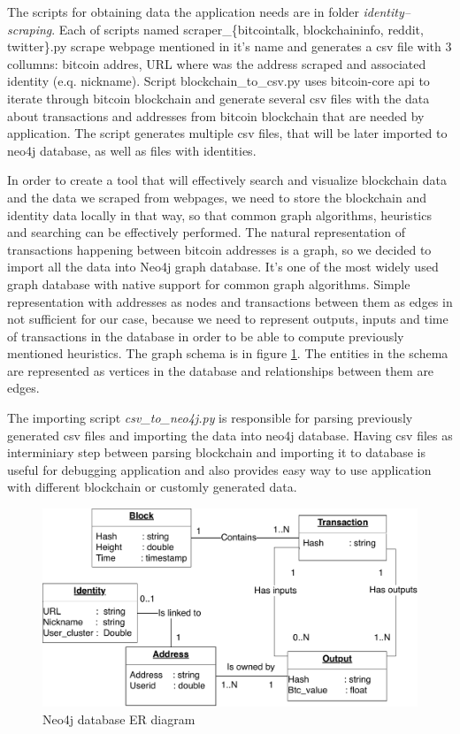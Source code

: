 \documentclass[
  digital, %
  table,   %
  lof,     %
  lot,     %
  oneside
]{fithesis3}
\begin{document}
The scripts for obtaining data the application needs are in folder \emph{identity--scraping}.
Each of scripts named scraper\_\{bitcointalk, blockchaininfo, reddit, twitter\}.py scrape webpage mentioned
in it's name and generates a csv file with 3 collumns:
bitcoin addres, URL where was the address scraped and associated identity (e.q. nickname).
Script blockchain\_to\_csv.py uses bitcoin-core api to iterate through bitcoin blockchain 
and generate several csv files with the data about transactions and addresses from bitcoin blockchain that are needed by application.
The script generates multiple csv files, that will be later imported to neo4j database, as well as 
files with identities.

In order to create a tool that will effectively search and visualize blockchain data and the 
data we scraped from webpages, we need to store the blockchain and identity data locally in that way, so that common
graph algorithms, heuristics and searching can be effectively performed.
The natural representation of transactions happening between
bitcoin addresses is a graph, so we decided to import all the data into Neo4j graph database. It's one of the
most widely used graph database with native support for common graph algorithms.
Simple representation with addresses as nodes and transactions between them as edges in not
sufficient for our case, because we need to represent
outputs, inputs and time of transactions in the database in order to be able to compute previously mentioned heuristics. 
The graph schema is in figure \ref{neo4jschema}. The entities in the schema are represented as vertices
 in the database and relationships between them are edges.

The importing script \emph{csv\_to\_neo4j.py} is responsible for parsing
previously generated csv files and importing the data into neo4j database.
Having csv files as interminiary step between parsing blockchain and importing it to database
is useful for debugging application and also provides easy way to
use application with different blockchain or customly generated data.

\begin{figure}[!htb]
    \centering
    \includegraphics[width=1\textwidth]{neo4j-schema}
    \caption{Neo4j database ER diagram}
    \label{neo4jschema}
\end{figure}
\end{document}
